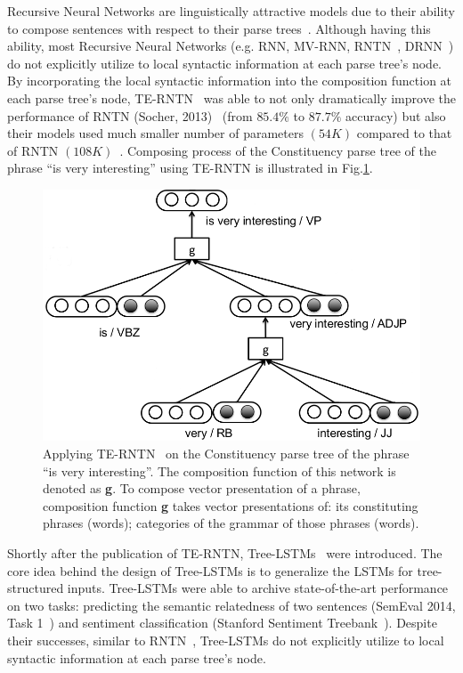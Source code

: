 Recursive Neural Networks are linguistically attractive models due to their ability to compose sentences with respect to their parse trees~\cite{treeLSTM}.
Although having this ability, most Recursive Neural Networks (e.g. RNN, MV-RNN, RNTN~\cite{socher2013recursive}, DRNN~\cite{IrsoyDRNN}) do not explicitly utilize to local syntactic information at each parse tree's node.
By incorporating the local syntactic information into the composition function at each parse tree's node, TE-RNTN~\cite{tag-embedding-rnn} was able to not only dramatically improve the performance of RNTN (Socher, 2013)~\cite{socher2013recursive} (from \(85.4\%\) to \(87.7\%\) accuracy) but also their models used much smaller number of parameters \((54K)\) compared to that of RNTN \((108K)\)~\cite{tag-embedding-rnn}.
Composing process of the Constituency parse tree of the phrase ``is very interesting'' using TE-RNTN is illustrated in Fig.\ref{fig:example-compose-tag}.

\begin{figure}[H]
    \centering
    \includegraphics[scale=0.4]{figure/example-compose-tag}
    \caption[Applying TE-RNTN on the phrase ``is very interesting'']{Applying TE-RNTN~\cite{tag-embedding-rnn} on the Constituency parse tree of the phrase ``is very interesting''.
    The composition function of this network is denoted as \textbf{g}.
    To compose vector presentation of a phrase, composition function \textbf{g} takes vector presentations of: its constituting phrases (words); categories of the grammar of those phrases (words).}
    \label{fig:example-compose-tag}
\end{figure}

Shortly after the publication of TE-RNTN, Tree-LSTMs~\cite{treeLSTM} were introduced.
The core idea behind the design of Tree-LSTMs is to generalize the LSTMs for tree-structured inputs.
Tree-LSTMs were able to archive state-of-the-art performance on two tasks: predicting the semantic relatedness of two sentences (SemEval 2014, Task 1~\cite{SemeEvalTask1}) and sentiment classification (Stanford Sentiment Treebank~\cite{socher2013recursive}).
Despite their successes, similar to RNTN~\cite{socher2013recursive}, Tree-LSTMs do not explicitly utilize to local syntactic information at each parse tree's node.

